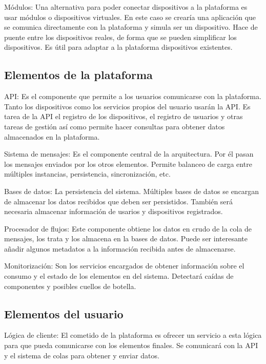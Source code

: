 Módulos: Una alternativa para poder conectar dispositivos a la plataforma es
usar módulos o dispositivos virtuales. En este caso se crearía una aplicación
que se comunica directamente con la plataforma y simula ser un dispositivo.
Hace de puente entre los dispositivos reales, de forma que se pueden simplificar
los dispositivos. Es útil para adaptar a la plataforma dispositivos existentes.

\subsection{Elementos de la plataforma}

API: Es el componente que permite a los usuarios comunicarse con la plataforma.
Tanto los dispositivos como los servicios propios del usuario usarán la API. Es
tarea de la API el registro de los dispositivos, el registro de usuarios y otras
tareas de gestión así como permite hacer consultas para obtener datos
almacenados en la plataforma.

Sistema de mensajes: Es el componente central de la arquitectura. Por él pasan
los mensajes enviados por los otros elementos. Permite balanceo de carga entre
múltiples instancias, persistencia, sincronización, etc.

Bases de datos: La persistencia del sistema. Múltiples bases de datos se
encargan de almacenar los datos recibidos que deben ser persistidos. También
será necesaria almacenar información de usarios y dispositivos registrados.

Procesador de flujos: Este componente obtiene los datos en crudo de la cola de
mensajes, los trata y los almacena en la bases de datos. Puede ser interesante
añadir algunos metadatos a la información recibida antes de almacenarse.

Monitorización: Son los servicios encargados de obtener información sobre el
consumo y el estado de los elementos en del sistema. Detectará caídas de
componentes y posibles cuellos de botella.

\subsection{Elementos del usuario}

Lógica de cliente: El cometido de la plataforma es ofrecer un servicio a esta
lógica para que pueda comunicarse con los elementos finales. Se comunicará con
la API y el sistema de colas para obtener y enviar datos.
